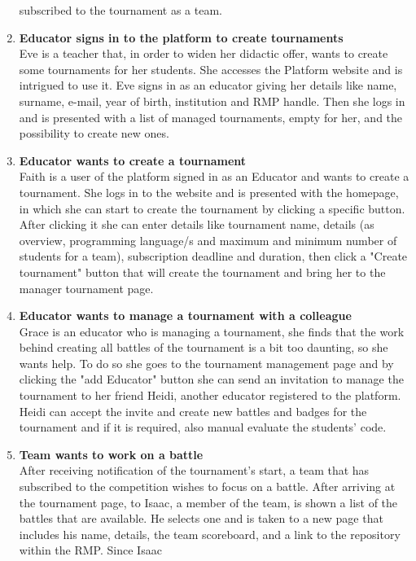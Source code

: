 \begin{enumerate}[label= \textbf{SC\arabic*}]
    subscribed to the tournament as a team.
    \item \textbf{Educator signs in to the platform to create tournaments} \label{sc:sc4}\\ Eve is a teacher that, in order to widen her didactic offer, wants to create some tournaments for her students. She accesses the Platform website and is 
    intrigued to use it. Eve signs in as an educator giving her details like name, surname, e-mail, year of birth, institution and RMP handle. Then she logs in and is presented with a list of managed tournaments, empty for her, 
    and the possibility to create new ones.
    \item \textbf{Educator wants to create a tournament} \label{sc:sc5}\\ Faith is a user of the platform signed in as an Educator and wants to create a tournament. She logs in to the website and is presented with the homepage, in which she can 
    start to create the tournament by clicking a specific button. After clicking it she can enter details like tournament name, details (as overview, programming language/s and maximum and minimum number of students for a team),
    subscription deadline and duration, then click a "Create tournament" button that will create the tournament and bring her to the manager tournament page. 
    \item \textbf{Educator wants to manage a tournament with a colleague} \label{sc:sc6}\\ Grace is an educator who is managing a tournament, she finds that the work behind creating all battles of the tournament is a bit too daunting, so she wants 
    help. To do so she goes to the tournament management page and by clicking the "add Educator" button she can send an invitation to manage the tournament to her friend Heidi, another educator registered to the platform. Heidi 
    can accept the invite and create new battles and badges for the tournament and if it is required, also manual evaluate the students' code.
    \item \textbf{Team wants to work on a battle} \label{sc:sc7} \\ After receiving notification of the tournament's start, a team that has subscribed to the competition wishes to focus on a battle. After arriving at the tournament page, to Isaac, 
    a member of the team, is shown a list of the battles that are available. He selects one and is taken to a new page that includes his name, details, the team scoreboard, and a link to the repository within the RMP. Since Isaac 

\end{enumerate}
